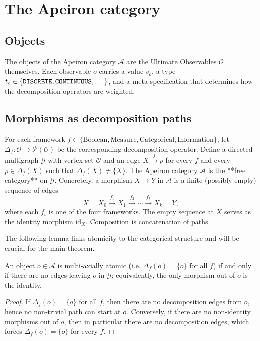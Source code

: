 \section{The Apeiron category}\label{sec:cat_def}

\subsection{Objects}
The objects of the Apeiron category $\mathcal{A}$ are the Ultimate Observables $\mathcal{O}$ themselves.
Each observable $o$ carries a value $v_o$, a type $t_o\in\{\text{\tt DISCRETE},\text{\tt CONTINUOUS},\dots\}$, and a meta‑specification that determines how the decomposition operators are weighted.

\subsection{Morphisms as decomposition paths}
For each framework $f \in \{\text{Boolean}, \text{Measure}, \text{Categorical}, \text{Information}\}$,
let $\Delta_f : \mathcal{O} \to \mathcal{P}(\mathcal{O})$ be the corresponding decomposition operator.
Define a directed multigraph $\mathcal{G}$ with vertex set $\mathcal{O}$ and an edge $X \xrightarrow{f} p$ for every $f$ and every $p \in \Delta_f(X)$ such that $\Delta_f(X) \neq \{X\}$.
The Apeiron category $\mathcal{A}$ is the **free category** on $\mathcal{G}$.
Concretely, a morphism $X \to Y$ in $\mathcal{A}$ is a finite (possibly empty) sequence of edges
\[
X = X_0 \xrightarrow{f_1} X_1 \xrightarrow{f_2} \cdots \xrightarrow{f_k} X_k = Y,
\]
where each $f_i$ is one of the four frameworks.
The empty sequence at $X$ serves as the identity morphism $\mathrm{id}_X$.
Composition is concatenation of paths.

The following lemma links atomicity to the categorical structure and will be crucial for the main theorem.

\begin{lemma}\label{lem:atomic_separated}
An object $o \in \mathcal{A}$ is multi‑axially atomic (i.e. $\Delta_f(o) = \{o\}$ for all $f$) if and only if there are no edges leaving $o$ in $\mathcal{G}$; equivalently, the only morphism out of $o$ is the identity.
\end{lemma}
\begin{proof}
If $\Delta_f(o) = \{o\}$ for all $f$, then there are no decomposition edges from $o$, hence no non‑trivial path can start at $o$.
Conversely, if there are no non‑identity morphisms out of $o$, then in particular there are no decomposition edges, which forces $\Delta_f(o) = \{o\}$ for every $f$.
\end{proof}